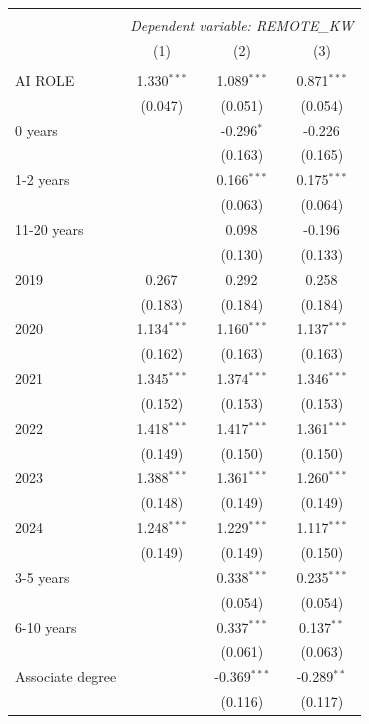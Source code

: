 \begin{table}[!htbp] \centering
\begin{tabular}{@{\extracolsep{5pt}}lccc}
\\[-1.8ex]\hline
\hline \\[-1.8ex]
& \multicolumn{3}{c}{\textit{Dependent variable: REMOTE_KW}} \
\cr \cline{2-4}
\\[-1.8ex] & (1) & (2) & (3) \\
\hline \\[-1.8ex]
 AI ROLE & 1.330$^{***}$ & 1.089$^{***}$ & 0.871$^{***}$ \\
& (0.047) & (0.051) & (0.054) \\
 0 years & & -0.296$^{*}$ & -0.226$^{}$ \\
& & (0.163) & (0.165) \\
 1-2 years & & 0.166$^{***}$ & 0.175$^{***}$ \\
& & (0.063) & (0.064) \\
 11-20 years & & 0.098$^{}$ & -0.196$^{}$ \\
& & (0.130) & (0.133) \\
 2019 & 0.267$^{}$ & 0.292$^{}$ & 0.258$^{}$ \\
& (0.183) & (0.184) & (0.184) \\
 2020 & 1.134$^{***}$ & 1.160$^{***}$ & 1.137$^{***}$ \\
& (0.162) & (0.163) & (0.163) \\
 2021 & 1.345$^{***}$ & 1.374$^{***}$ & 1.346$^{***}$ \\
& (0.152) & (0.153) & (0.153) \\
 2022 & 1.418$^{***}$ & 1.417$^{***}$ & 1.361$^{***}$ \\
& (0.149) & (0.150) & (0.150) \\
 2023 & 1.388$^{***}$ & 1.361$^{***}$ & 1.260$^{***}$ \\
& (0.148) & (0.149) & (0.149) \\
 2024 & 1.248$^{***}$ & 1.229$^{***}$ & 1.117$^{***}$ \\
& (0.149) & (0.149) & (0.150) \\
 3-5 years & & 0.338$^{***}$ & 0.235$^{***}$ \\
& & (0.054) & (0.054) \\
 6-10 years & & 0.337$^{***}$ & 0.137$^{**}$ \\
& & (0.061) & (0.063) \\
 Associate degree & & -0.369$^{***}$ & -0.289$^{**}$ \\
& & (0.116) & (0.117) \\

\end{tabular}
\end{table}
